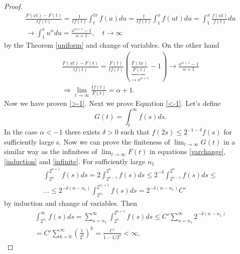 \documentclass[english,12pt,a4paper,pdftex,sci,utf8]{aaltothesis} %
\begin{document}
\begin{proof}
\begin{equation*}
\begin{split}
\frac{F(xt)-F(t)}{tf(t)} = \frac{1}{tf(t)} \int_{t}^{tx}f(u)du = \frac{t}{tf(t)} \int_{1}^{x} f(ut)du = \int_1^x \frac{f(ut)}{f(t)}du \\
\rightarrow \int_1^x u^{\alpha}du = \frac{x^{\alpha+1}-1}{\alpha+1}, \quad t \rightarrow \infty
\end{split}
\end{equation*}
by the Theorem \ref{uniform} and change of variables. On the other hand 
\begin{equation*}
\begin{split}
\frac{F(xt)-F(t)}{tf(t)} = \frac{F(t)}{tf(t)}\left(\underbrace{\frac{F(tx)}{F(t)}}_{\rightarrow x^{\alpha+1}} - 1\right) \rightarrow \frac{x^{\alpha+1}-1}{\alpha+1} \\
\Rightarrow \lim_{t \rightarrow \infty} \frac{tf(t)}{F(t)}= \alpha + 1.
\end{split}
\end{equation*}
Now we have proven \eqref{>-1}. Next we prove Equation \eqref{<-1}. Let's define
\begin{equation*}
G(t) = \int_{t}^{\infty} f(s)ds.
\end{equation*}
In the case $\alpha<-1$ there exists $\delta>0$ such that $f(2s) \leq 2^{-1-\delta}f(s)$ for sufficiently large s. Now we can prove the finiteness of $\lim_{t \rightarrow \infty} G(t)$ in a similar way as the infinitess of $\lim_{t \rightarrow \infty} F(t)$ in equations \eqref{varchange}, \eqref{induction} and \eqref{infinite}. For sufficiently large $n_1$
\begin{equation*}
\begin{split}
\int_{2^{n}}^{2^{n+1}} f(s)ds = 2 \int_{2^{n-1}}^{2^{n}} f(s)ds \leq 2^{-\delta} \int_{2^{n-1}}^{2^n} f(s)ds \leq \\ ... \leq 2^{-\delta(n-n_1)} \int_{2^{n_1}}^{2^{n_1+1}} f(s)ds = 2^{-\delta(n-n_1)} C'
\end{split}
\end{equation*}
by induction and change of variables. Then
\begin{equation*}
\begin{split}
\int_{2^{n_1}}^{\infty} f(s)ds = \sum_{n=n_1}^{\infty} \int_{2^{n}}^{2^{n+1}} f(s)ds \leq C' \sum_{n=n_1}^{\infty} 2^{-\delta(n-n_1)} \\
=C' \sum_{k=0}^{\infty} \left( \frac{1}{2^{\delta}}\right)^k = \frac{C'}{1-1/2^{\delta}}<\infty,
\end{split}
\end{equation*}

\end{proof}
\end{document}
